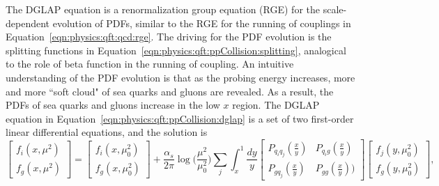 \noindent The DGLAP equation is a renormalization group equation (RGE) for the scale-dependent evolution of PDFs, similar to the RGE for the running of couplings in Equation~\ref{eqn:physics:qft:qcd:rge}. The driving for the PDF evolution is the splitting functions in Equation~\ref{eqn:physics:qft:ppCollision:splitting}, analogical to the role of beta function in the running of coupling.  An intuitive understanding of the PDF evolution is that as the probing energy increases, more and more ``soft cloud" of sea quarks and gluons are revealed. As a result, the PDFs of sea quarks and gluons increase in the low $x$ region. The DGLAP equation in Equation~\ref{eqn:physics:qft:ppCollision:dglap} is a set of two first-order linear differential equations, and the solution is
\begin{equation}
    \begin{bmatrix} f_i(x,\mu^2) \\ f_g(x,\mu^2) \end{bmatrix} = \begin{bmatrix} f_i(x,\mu_0^2) \\ f_g(x,\mu_0^2) \end{bmatrix} + 
    \frac{\alpha_s}{2\pi} \log\bigg(\frac{\mu^2}{\mu_0^2}\bigg) 
    \sum_j \int_x^1 
    \frac{dy}{y}
    \begin{bmatrix} P_{q_i q_j}(\frac{x}{y}) & P_{q_i g}(\frac{x}{y}) \\ P_{g q_j}(\frac{x}{y}) & P_{gg}(\frac{x}{y})) \end{bmatrix} \begin{bmatrix} f_j(y,\mu^2_0) \\ f_g(y,\mu^2_0) \end{bmatrix}, 
\end{equation}

